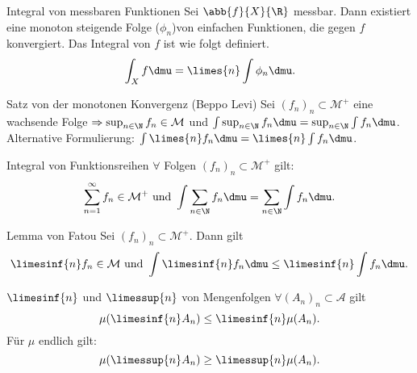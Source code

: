 \begin{karte}{Integral von messbaren Funktionen}
	Sei \( \abb{f}{X}{\R} \) messbar. Dann existiert eine monoton steigende 
	Folge (\( \phi_n\))von einfachen Funktionen, die gegen \(f\) konvergiert.
	Das Integral von \(f\) ist wie folgt definiert.
	\[ \int_X f \dmu = \limes{n} \int \phi_n \dmu. \]
\end{karte}

\begin{karte}{Satz von der monotonen Konvergenz (Beppo Levi)}
	Sei \( (f_n)_n \subset \mathcal{M}^+ \) eine wachsende Folge
	\( \Rightarrow \sup_{n\in\N} f_n \in \mathcal{M} \) und 
	\( \int \sup_{n\in\N} f_n \dmu 
	= \sup_{n\in\N} \int f_n \dmu \).\\
	Alternative Formulierung: 
	\( \int \limes{n} f_n \dmu 
	= \limes{n} \int f_n \dmu \).
\end{karte}

\begin{karte}{Integral von Funktionsreihen}
	\( \forall \) Folgen \( (f_n)_n \subset \mathcal{M}^+ \) gilt: 
	\[ \sum_{n=1}^{\infty} f_n \in \mathcal{M}^+ \text{ und } \int \sum_{n\in\N} f_n \dmu 
	= \sum_{n\in\N} \int f_n \dmu. \]
\end{karte}

\begin{karte}{Lemma von Fatou}
	Sei \( (f_n)_n \subset \mathcal{M}^+ \). Dann gilt 
	\[ \limesinf{n} f_n \in \mathcal{M} 
	\text{ und } \int \limesinf{n} f_n \dmu \leq \limesinf{n} \int f_n \dmu. \]
\end{karte}

\begin{karte}{\(\limesinf{n}\) und \( \limessup{n} \) von Mengenfolgen}
	\( \forall (A_n)_n \subset \mathcal{A} \) gilt 
	\[ \mu(\limesinf{n} A_n) \leq \limesinf{n} \mu(A_n). \]
	Für \( \mu \) endlich gilt: 
	\[ \mu(\limessup{n} A_n) \geq \limessup{n} \mu(A_n). \]
\end{karte}